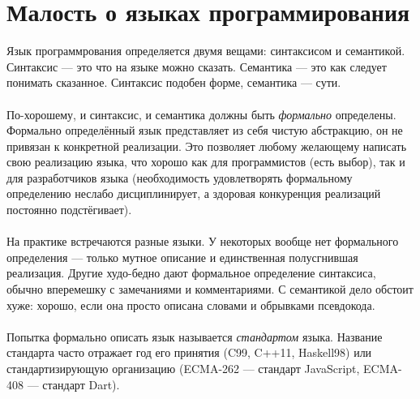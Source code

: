 \documentclass[11pt]{book}
\begin{document}
\chapter{Малость о языках программирования}
Язык программрования определяется двумя вещами: синтаксисом и семантикой.
Синтаксис --- это что на языке можно сказать.
Семантика --- это как следует понимать сказанное.
Синтаксис подобен форме, семантика --- сути.
\\ \\
По-хорошему, и синтаксис, и семантика должны быть \emph{формально} определены.
Формально определённый язык представляет из себя чистую абстракцию, он не привязан к конкретной реализации.
Это позволяет любому желающему написать свою реализацию языка,
что хорошо как для программистов (есть выбор),
так и для разработчиков языка (необходимость удовлетворять формальному определению неслабо дисциплинирует,
а здоровая конкуренция реализаций постоянно подстёгивает).
\\ \\
На практике встречаются разные языки.
У некоторых вообще нет формального определения --- только мутное описание и единственная полусгнившая реализация.
Другие худо-бедно дают формальное определение синтаксиса, обычно вперемешку с замечаниями и комментариями.
С семантикой дело обстоит хуже: хорошо, если она просто описана словами и обрывками псевдокода.
\\ \\
Попытка формально описать язык называется \emph{стандартом} языка.
Название стандарта часто отражает год его принятия (C99, C++11, Haskell98)
или стандартизирующую организацию (ECMA-262 --- стандарт JavaScript, ECMA-408 --- стандарт Dart).
\end{document}
